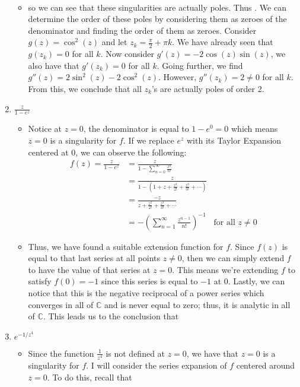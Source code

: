 \documentclass[10pt,a4paper]{article}
\theoremstyle{definition}
\begin{document}
\begin{enumerate}[label = (\alph*)]
\begin{itemize}
\begin{align*}
	\end{align*}
	\item so we can see that these singularities are actually poles. Thus . We can determine the order of these poles by considering them as zeroes of the denominator and finding the order of them as zeroes. Consider $g(z) = \cos^2(z)$ and let $z_k = \frac{\pi}{2} + \pi k$. We have already seen that $g(z_k) = 0$ for all $k$. Now consider $g'(z) = -2\cos(z)\sin(z)$, we also have that $g'(z_k) = 0$ for all $k$. Going further, we find $g''(z) = 2\sin^2(z) - 2\cos^2(z)$. However, $g''(z_k) = 2 \neq 0$ for all $k$. From this, we conclude that all $z_k$'s are actually poles of order 2.
	\end{itemize}
\item $\displaystyle \frac{z}{1 - e^z}$
	\begin{itemize}
	\item Notice at $z = 0$, the denominator is equal to $1 - e^0 = 0$ which means $z = 0$ is a singularity for $f$. If we replace $e^z$ with its Taylor Expansion centered at 0, we can observe the following:
	\begin{align*}
	f(z) = \frac{z}{1 - e^z} &= \frac{z}{\displaystyle 1 - \sum_{n = 0}^{\infty}\frac{z^n}{n!}}\\
	&= \frac{z}{\displaystyle 1 - \left(1 + z + \frac{z^2}{2!} + \frac{z^3}{3!} + \cdots\right)}\\
	&= \frac{-z}{\displaystyle z + \frac{z^2}{2!} + \frac{z^3}{3!} + \cdots}\\
	&= -\left(\sum_{n = 1}^{\infty} \frac{z^{n-1}}{n!}\right)^{-1} &\text{for all $z \neq 0$}
	\end{align*}
	\item Thus, we have found a suitable extension function for $f$. Since $f(z)$ is equal to that last series at all points $z \neq 0$, then we can simply extend $f$ to have the value of that series at $z = 0$. This means we're extending $f$ to satisfy $f(0) = -1$ since this series is equal to $-1$ at 0. Lastly, we can notice that this is the negative reciprocal of a power series which converges in all of $\mathbb{C}$ and is never equal to zero; thus, it is analytic in all of $\mathbb{C}$. This leads us to the conclusion that 
	\end{itemize}
\item $e^{-1/z^4}$
	\begin{itemize}
	\item Since the function $\frac{1}{z^4}$ is not defined at $z = 0$, we have that $z = 0$ is a singularity for $f$. I will consider the series expansion of $f$ centered around $z = 0$. To do this, recall that 

\end{itemize}
\end{enumerate}
\end{document}
